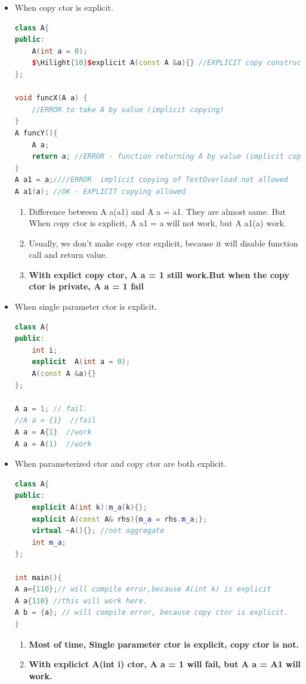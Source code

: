 \documentclass[a4paper,11pt,twoside]{book}
\newcommand{\Hilight}[1]{\makebox[0pt][l]{\color{yellow}\rule[-3pt]{#1em}{11pt}}}
\newcommand{\Hilight}[1]{}
\begin{document}
\begin{itemize}
	\item  When copy ctor is explicit.
\begin{lstlisting}[frame=single, language=c++]
class A{
public:
	A(int a = 0);
	$\Hilight{10}$explicit A(const A &a){} //EXPLICIT copy constructor
};
	
void funcX(A a) {
	//ERROR to take A by value (implicit copying)	
}
A funcY(){ 
	A a;
	return a; //ERROR - function returning A by value (implicit copying)
}
A a1 = a;////ERROR  implicit copying of TestOverload not allowed
A a1(a); //OK - EXPLICIT copying allowed
\end{lstlisting}
	
	\begin{enumerate}
		\item Difference between A a(a1) and A a = a1.  They are almost same. But When copy ctor is explicit,  A a1 = a will not work, but A a1(a) work.
		
		\item Usually, we don't make copy ctor explicit, because it will disable function call and return value.
		
		\item \textbf{With explict copy ctor, A a = 1 still work.But when the copy ctor is private, A a = 1 fail}

	\end{enumerate}

\item  When single parameter ctor is explicit.
\begin{lstlisting}[frame=single, language=c++]
class A{
public:
	int i;
	explicit  A(int a = 0);
	A(const A &a){} 
};

A a = 1; // fail. 
//A a = {1}  //fail
A a = A{1}  //work
A a = A(1)  //work
\end{lstlisting}

\item When parameterized ctor and copy ctor are both explicit.
\begin{lstlisting}[frame=single, language=c++]
class A{
public:
	explicit A(int k):m_a(k){};
	explicit A(const A& rhs){m_a = rhs.m_a;};
	virtual ~A(){}; //not aggregate
	int m_a;
};

int main(){
A a={110};// will compile error,because A(int k) is explicit
A a{110} //this will work here.
A b = {a}; // will compile error, because copy ctor is explicit.
}
\end{lstlisting}

\begin{enumerate}
	\item  \textbf{Most of time, Single parameter ctor is explicit, copy ctor is not.}
	\item \textbf{With explicict A(int i) ctor, A a = 1 will fail, but A a = A{1} will work.} 
\end{enumerate}


\end{itemize}
\end{document}
